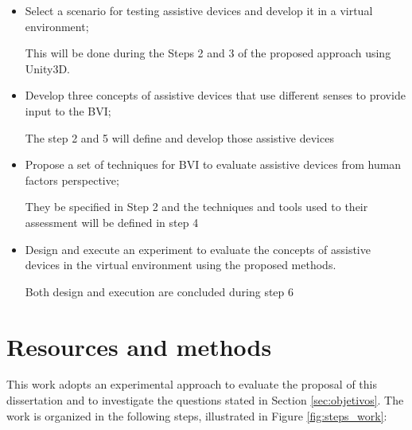  \begin{itemize}
     \item Select a scenario for testing assistive devices and develop it in a virtual environment; \label{itm:subobj_first}
     
     This will be done during the Steps 2 and 3 of the proposed approach using Unity3D.

     \item Develop three concepts of assistive devices that use different senses to provide input to the BVI; \label{itm:subobj_second}
     
     The step 2 and 5 will define and develop those assistive devices

     \item Propose a set of techniques for BVI to evaluate assistive devices from human factors perspective; \label{itm:subobj_third}
     
    They be specified in Step 2 and the techniques and tools used to their assessment will be defined in step 4

     \item Design and execute an experiment to evaluate the concepts of assistive devices in the virtual environment using the proposed  methods. \label{itm:subobj_forth}
    
    Both design and execution are concluded during step 6
 \end{itemize}
 
% 

\section{Resources and methods} 

This work adopts an experimental approach to evaluate the proposal of this dissertation and to investigate the questions stated in Section \ref{sec:objetivos}. 
The work is organized in the following steps, illustrated in Figure \ref{fig:steps_work}:

